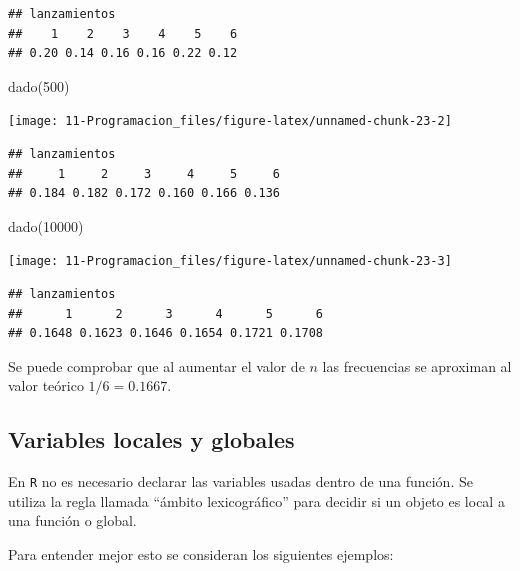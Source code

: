 \documentclass[
]{book}
\newenvironment{Shaded}{\begin{snugshade}}{\end{snugshade}}
\newcommand{\DecValTok}[1]{\textcolor[rgb]{0.00,0.00,0.81}{#1}}
\newcommand{\FunctionTok}[1]{\textcolor[rgb]{0.00,0.00,0.00}{#1}}
\newcommand{\NormalTok}[1]{#1}
\theoremstyle{break}
\theoremstyle{nonumberplain}
\begin{document}
\begin{verbatim}
## lanzamientos
##    1    2    3    4    5    6 
## 0.20 0.14 0.16 0.16 0.22 0.12
\end{verbatim}

\begin{Shaded}
\begin{Highlighting}[]
\FunctionTok{dado}\NormalTok{(}\DecValTok{500}\NormalTok{)}
\end{Highlighting}
\end{Shaded}

\begin{center}\texttt{[image: 11-Programacion\_files/figure-latex/unnamed-chunk-23-2]} \end{center}

\begin{verbatim}
## lanzamientos
##     1     2     3     4     5     6 
## 0.184 0.182 0.172 0.160 0.166 0.136
\end{verbatim}

\begin{Shaded}
\begin{Highlighting}[]
\FunctionTok{dado}\NormalTok{(}\DecValTok{10000}\NormalTok{)}
\end{Highlighting}
\end{Shaded}

\begin{center}\texttt{[image: 11-Programacion\_files/figure-latex/unnamed-chunk-23-3]} \end{center}

\begin{verbatim}
## lanzamientos
##      1      2      3      4      5      6 
## 0.1648 0.1623 0.1646 0.1654 0.1721 0.1708
\end{verbatim}

Se puede comprobar que al aumentar el valor de \(n\) las frecuencias se
aproximan al valor teórico \(1/6=0.1667\).

\hypertarget{variables-locales-y-globales}{%
\subsection{Variables locales y globales}\label{variables-locales-y-globales}}

En \texttt{R} no es
necesario declarar las variables usadas dentro de una función. Se
utiliza la regla llamada ``ámbito lexicográfico'' para decidir si un
objeto es local a una función o global.

Para entender mejor esto se consideran los siguientes ejemplos:
\end{document}
